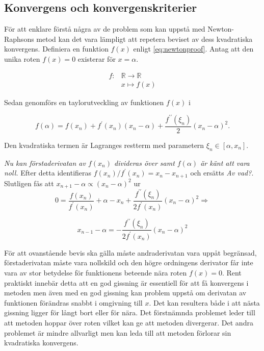 \subsection{Konvergens och konvergenskriterier}

För att enklare förstå några av de problem som kan uppstå med Newton-Raphsons metod kan det vara lämpligt
att repetera beviset av dess kvadratiska konvergens. Definiera en funktion $f(x)$ enligt \eqref{eq:newtonproof}.
Antag att den unika roten $f(x) = 0$ existerar för $x = \alpha$.

\begin{align}
f: & \mathbb{R} \to \mathbb{R} \nonumber \\
   & x \mapsto f(x) \label{eq:newtonproof}
\end{align}

\noindent
Sedan genomförs en taylorutveckling av funktionen $f(x)$ i 

\begin{equation}
\label{eq:newtonprooftaylor}
f(\alpha) = f(x_n) + f^\prime(x_n)(x_n-\alpha) + \frac{f^{\prime\prime}(\xi_n)}{2}(x_n-\alpha)^2.
\end{equation}

Den kvadratiska termen är Lagranges restterm med parametern $\xi_n \in [\alpha, x_n]$.

\emph{\color{red} Nu kan förstaderivatan av $f(x_n)$ divideras över samt $f(\alpha)$ är känt att vara noll.}
Efter detta identifieras $f(x_n)/f^\prime(x_n) = x_n-x_{n+1}$ och ersätts \emph{\color{red} Av vad?}. Slutligen fås att $x_{n+1}-\alpha \propto (x_{n}-\alpha)^2$ ur
\begin{equation}
0 = \frac{f(x_n)}{f^\prime(x_n)} + \alpha - x_n + \frac{f^{\prime\prime}(\xi_n)}{2f^\prime(x_n)}(x_n-\alpha)^2
\Rightarrow
\end{equation}

\begin{equation}
\label{eq:newtonqed}
x_{n-1} - \alpha = - \frac{f^{\prime\prime}(\xi_n)}{2f^\prime(x_n)}(x_n-\alpha)^2 
\end{equation}

För att ovanstående bevis ska gälla måste andraderivatan vara uppåt begränsad, förstaderivatan måste vara nollskild och den högre ordningens derivator får inte vara av stor betydelse för funktionens beteende nära roten $f(x) = 0$. Rent praktiskt innebär detta att en god gissning är essentiell för att få
konvergens i metoden men även med en god gissning kan problem uppstå om derivatan av funktionen
förändras snabbt i omgivning till $x$. Det kan resultera både i att nästa gissning ligger för långt
bort eller för nära. Det förstnämnda problemet leder till att metoden hoppar över roten vilket kan ge att metoden divergerar. Det andra problemet är mindre allvarligt men kan leda till att metoden förlorar sin kvadratiska konvergens.

